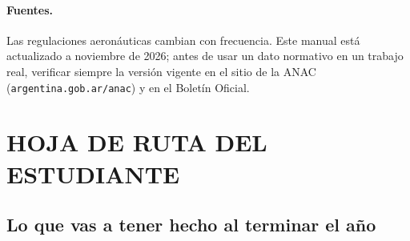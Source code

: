 \paragraph*{Fuentes.} Las regulaciones aeronáuticas cambian con frecuencia. Este manual está
actualizado a noviembre de 2026; antes de usar un dato normativo en un trabajo real, verificar
siempre la versión vigente en el sitio de la ANAC (\texttt{argentina.gob.ar/anac}) y en el
Boletín Oficial.

\clearpage
\section*{HOJA DE RUTA DEL ESTUDIANTE}
\subsection*{Lo que vas a tener hecho al terminar el año}

